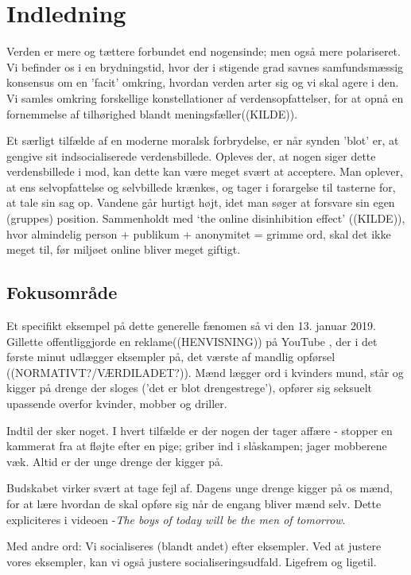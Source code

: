 \section{Indledning} 

Verden er mere og tættere forbundet end nogensinde; men også mere polariseret.
Vi befinder os i en brydningstid, hvor der i stigende grad savnes
samfundsmæssig konsensus om en 'facit' omkring, hvordan verden arter sig og vi
skal agere i den. Vi samles omkring forskellige konstellationer af
verdensopfattelser, for at opnå en fornemmelse af tilhørighed blandt
meningsfæller((KILDE)). 

Et særligt tilfælde af en moderne moralsk forbrydelse, er når synden 'blot' er,
at gengive sit indsocialiserede verdensbillede. Opleves der, at nogen siger
dette verdensbillede i mod, kan dette kan være meget svært at acceptere. Man
oplever, at ens selvopfattelse og selvbillede krænkes, og tager i forargelse
til tasterne for, at tale sin sag op. Vandene går hurtigt højt, idet man søger
at forsvare sin egen (gruppes) position. Sammenholdt med ‘the online
disinhibition effect' ((KILDE)), hvor almindelig person + publikum + anonymitet
= grimme ord, skal det ikke meget til, før miljøet online bliver meget giftigt.

\subsection{Fokusområde}

Et specifikt eksempel på dette generelle fænomen så vi den 13. januar 2019.
Gillette offentliggjorde en reklame((HENVISNING)) på YouTube , der i det første
minut udlægger eksempler på, det værste af mandlig opførsel
((NORMATIVT?/VÆRDILADET?)).  Mænd lægger ord i kvinders mund, står og kigger på
drenge der sloges ('det er blot drengestrege'), opfører sig seksuelt upassende
overfor kvinder, mobber og driller.

Indtil der sker noget. I hvert tilfælde er der nogen der tager affære - stopper
en kammerat fra at fløjte efter en pige; griber ind i slåskampen; jager
mobberene væk.  Altid er der unge drenge der kigger på.

Budskabet virker svært at tage fejl af. Dagens unge drenge kigger på os mænd,
for at lære hvordan de skal opføre sig når de engang bliver mænd selv.  Dette
expliciteres i videoen -\textit{The boys of today will be the men of
tomorrow}.

Med andre ord: Vi socialiseres (blandt andet) efter eksempler. Ved at justere
vores eksempler, kan vi også justere socialiseringsudfald. Ligefrem og
ligetil.

